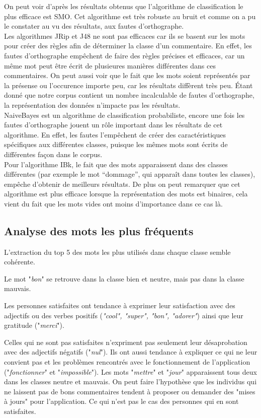 \documentclass[a4paper, 11pt]{article}
\begin{document}
On peut voir d'après les résultats obtenus que l'algorithme de classification le plus efficace est SMO. Cet algorithme est très robuste au bruit et comme on a pu le constater au vu des résultats, aux fautes d'orthographe.\\

Les algorithmes JRip et J48 ne sont pas efficaces car ils se basent sur les mots pour créer des règles afin de déterminer la classe d'un commentaire. En effet, les fautes d'orthographe empêchent de faire des règles précises et efficaces, car un même mot peut être écrit de plusieures manières différentes dans ces commentaires.
On peut aussi voir que le fait que les mots soient représentés par la présense ou l'occurence importe peu, car les résultats diffèrent très peu. \'{E}tant donné que notre corpus contient un nombre incalculable de fautes d'orthographe, la représentation des données n'impacte pas les résultats.\\

NaiveBayes est un algorithme de classification probabiliste, encore une fois les fautes d'orthographe jouent un rôle important dans les résultats de cet algorithme. En effet, les fautes l'empêchent de créer des caractéristiques spécifiques aux différentes classes, puisque les mêmes mots sont écrits de différentes façon dans le corpus.\\

Pour l'algorithme IBk, le fait que des mots apparaissent dans des classes différentes (par exemple le mot ``dommage'', qui apparaît dans toutes les classes), empêche d'obtenir de meilleurs résultats. De plus on peut remarquer que cet algorithme est plus efficace lorsque la représentation des mots est binaires, cela vient du fait que les mots vides ont moins d'importance dans ce cas là.

\subsection{Analyse des mots les plus fréquents}
L'extraction du top 5 des mots les plus utilisés dans chaque classe semble cohérente.

Le mot "\textit{bon}" se retrouve dans la classe bien et neutre, mais pas dans la classe mauvais.

Les personnes satisfaites ont tendance à exprimer leur satisfaction avec des adjectifs ou des verbes positifs (\textit{"cool", "super", "bon", "adorer"}) ainsi que leur gratitude ("\textit{merci}").  

Celles qui ne sont pas satisfaites n'expriment pas seulement leur désaprobation avec des adjectifs négatifs ("\textit{nul}"). Ils ont aussi tendance à expliquer ce qui ne leur convient pas et les problèmes rencontrés avec le fonctionnement de l'application ("\textit{fonctionner}" et "\textit{impossible}"). Les mots "\textit{mettre}" et "\textit{jour}" apparaissent tous deux dans les classes neutre et mauvais. On peut faire l'hypothèse que les individus qui ne laissent pas de bons commentaires tendent à proposer ou demander des "mises à jours" pour l'application. Ce qui n'est pas le cas des personnes qui en sont satisfaites.\\
\end{document}
